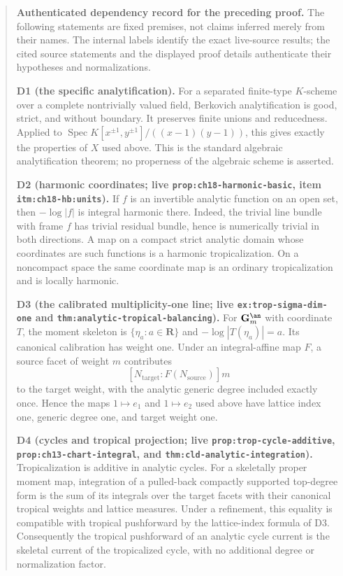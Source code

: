\begin{quote}
\textbf{Authenticated dependency record for the preceding proof.}
The following statements are fixed premises, not claims inferred merely from
their names.  The internal labels identify the exact live-source results;
the cited source statements and the displayed proof details authenticate
their hypotheses and normalizations.

\textbf{D1 (the specific analytification).}
For a separated finite-type $K$-scheme over a complete nontrivially valued
field, Berkovich analytification is good, strict, and without boundary.  It
preserves finite unions and reducedness.  Applied to
$\operatorname{Spec}K[x^{\pm1},y^{\pm1}]/((x-1)(y-1))$, this gives exactly
the properties of $X$ used above.  This is the standard algebraic
analytification theorem; no properness of the algebraic scheme is asserted.

\textbf{D2 (harmonic coordinates; live
\texttt{prop:ch18-harmonic-basic}, item \texttt{itm:ch18-hb:units}).}
If $f$ is an invertible analytic function on an open set, then
$-\log|f|$ is integral harmonic there.  Indeed, the trivial line bundle with
frame $f$ has trivial residual bundle, hence is numerically trivial in both
directions.  A map on a compact strict analytic domain whose coordinates
are such functions is a harmonic tropicalization.  On a noncompact space
the same coordinate map is an ordinary tropicalization and is locally
harmonic.

\textbf{D3 (the calibrated multiplicity-one line; live
\texttt{ex:trop-sigma-dim-one} and
\texttt{thm:analytic-tropical-balancing}).}
For $\mathbf G_m^{\an}$ with coordinate $T$, the moment skeleton is
$\{\eta_a:a\in\mathbf R\}$ and $-\log|T(\eta_a)|=a$.  Its canonical
calibration has weight one.  Under an integral-affine map $F$, a source
facet of weight $m$ contributes
\[
 [N_{\mathrm{target}}:F(N_{\mathrm{source}})]m
\]
to the target weight, with the analytic generic degree included exactly
once.  Hence the maps $1\mapsto e_1$ and $1\mapsto e_2$ used above have
lattice index one, generic degree one, and target weight one.

\textbf{D4 (cycles and tropical projection; live
\texttt{prop:trop-cycle-additive},
\texttt{prop:ch13-chart-integral}, and
\texttt{thm:cld-analytic-integration}).}
Tropicalization is additive in analytic cycles.  For a skeletally proper
moment map, integration of a pulled-back compactly supported top-degree form
is the sum of its integrals over the target facets with their canonical
tropical weights and lattice measures.  Under a refinement, this equality
is compatible with tropical pushforward by the lattice-index formula of D3.
Consequently the tropical pushforward of an analytic cycle current is the
skeletal current of the tropicalized cycle, with no additional degree or
normalization factor.


\end{quote}
